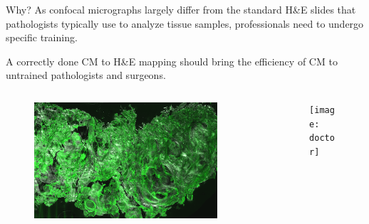 \documentclass[t]{beamer}
\begin{document}

\begin{frame}{Why?}
As confocal micrographs largely differ from the standard H\&E slides that
pathologists typically use to analyze tissue samples, professionals need
to undergo specific training.

A correctly done CM to H\&E mapping should bring the efficiency of CM
to untrained pathologists and surgeons.

\begin{columns}

\begin{column}{0.5\textwidth}
\begin{figure}
\centering
\includegraphics[width=0.9\textwidth]{CM-blend}
\end{figure}
\end{column}

\begin{column}{0.5\textwidth}
\begin{figure}
\centering
\texttt{[image: doctor]}
\end{figure}
\end{column}

\end{columns}
\end{frame}
\end{document}
